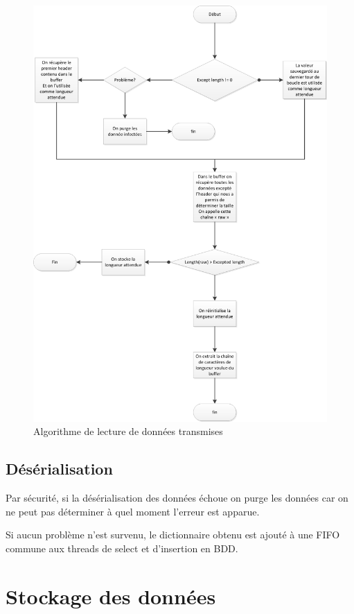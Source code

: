 \begin{figure}[h!]
	\centering 
	\includegraphics[scale=0.6]{images/datas_gathering.png}
	\caption{Algorithme de lecture de données transmises}
\end{figure}

\subsection*{Désérialisation}

Par sécurité, si la désérialisation des données échoue on purge les données car on ne peut pas déterminer à quel moment l'erreur est apparue.

Si aucun problème n'est survenu, le dictionnaire obtenu est ajouté à une FIFO commune aux threads de select et d'insertion en BDD.

\newpage

\section*{Stockage des données}
